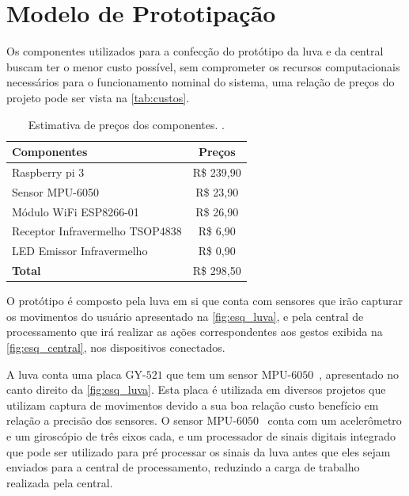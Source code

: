 
\section{Modelo de Prototipação}

Os componentes utilizados para a confecção do protótipo da luva e da central buscam ter o menor custo possível, sem comprometer os recursos computacionais necessários para o funcionamento nominal do sistema, uma relação de preços do projeto pode ser vista na \autoref{tab:custos}. 


\begin{table}[ht]
    \centering
    \begin{tabular}{|l|c|}
        \hline
        \textbf{Componentes}   & \textbf{Preços}   \\ \hline
        Raspberry pi 3         & R\$ 239,90        \\ \hline
        Sensor MPU-6050        & R\$ 23,90         \\ \hline
        Módulo WiFi ESP8266-01 & R\$ 26,90         \\ \hline
        Receptor Infravermelho TSOP4838 & R\$ 6,90 \\ \hline
        LED Emissor Infravermelho       & R\$ 0,90 \\ \hline
        \textbf{Total}         & R\$ 298,50        \\ \hline
    \end{tabular}
    \caption{Estimativa de preços dos componentes. \cite{filipeflop}.}
    \label{tab:custos}
\end{table}

O protótipo é composto pela luva em si que conta com sensores que irão capturar os movimentos do usuário apresentado na \autoref{fig:esq_luva}, e pela central de processamento que irá realizar as ações correspondentes aos gestos exibida na \autoref{fig:esq_central}, nos dispositivos conectados.


A luva conta uma placa GY-$521$ que tem um sensor MPU-$6050$~\cite{invensense}, apresentado no canto direito da \autoref{fig:esq_luva}. Esta placa é utilizada em diversos projetos que utilizam captura de movimentos devido a sua boa relação custo benefício em relação a precisão dos sensores. O sensor MPU-$6050$~\cite{invensense} conta com um acelerômetro e um giroscópio de três eixos cada, e um processador de sinais digitais integrado que pode ser utilizado para pré processar os sinais da luva antes que eles sejam enviados para a central de processamento, reduzindo a carga de trabalho realizada pela central.

